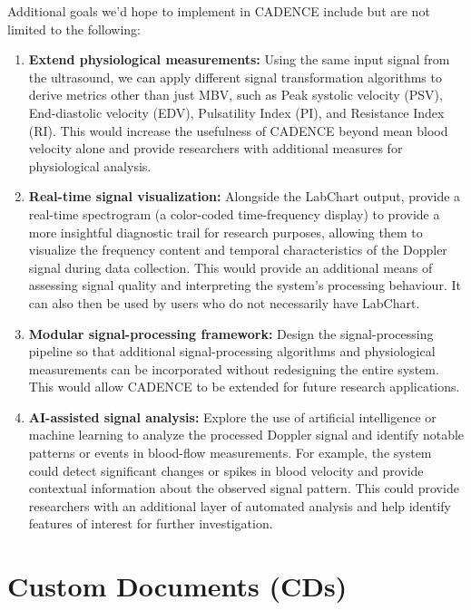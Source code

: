 \documentclass{article}
\begin{document}

Additional goals we'd hope to implement in CADENCE include but are not limited to the following:
\begin{enumerate}
    \item \textbf{Extend physiological measurements:} Using the same input signal from the ultrasound, we can apply different signal transformation algorithms to derive metrics other than just MBV, such as Peak systolic velocity (PSV), End-diastolic velocity (EDV), Pulsatility Index (PI), and Resistance Index (RI). This would increase the usefulness of CADENCE beyond mean blood velocity alone and provide researchers with additional measures for physiological analysis.
    \item \textbf{Real-time signal visualization:} Alongside the LabChart output, provide a real-time spectrogram (a color-coded time-frequency display) to provide a more insightful diagnostic trail for research purposes, allowing them to visualize the frequency content and temporal characteristics of the Doppler signal during data collection. This would provide an additional means of assessing signal quality and interpreting the system's processing behaviour. It can also then be used by users who do not necessarily have LabChart.
    \item \textbf{Modular signal-processing framework:} Design the signal-processing pipeline so that additional signal-processing algorithms and physiological measurements can be incorporated without redesigning the entire system. This would allow CADENCE to be extended for future research applications.
    \item \textbf{AI-assisted signal analysis:} Explore the use of artificial intelligence or machine learning to analyze the processed Doppler signal and identify notable patterns or events in blood-flow measurements. For example, the system could detect significant changes or spikes in blood velocity and provide contextual information about the observed signal pattern. This could provide researchers with an additional layer of automated analysis and help identify features of interest for further investigation.
\end{enumerate}

\section{Custom Documents (CDs)}
\end{document}

